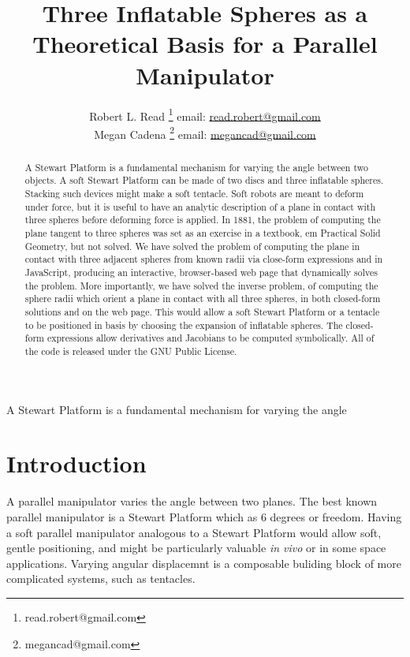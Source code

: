 \documentclass{article}
\title{Three Inflatable Spheres as a Theoretical Basis for a Parallel Manipulator}
\author{Robert L. Read
  \thanks{read.robert@gmail.com}
  email: \href{mailto:read.robert@gmail.com}{read.robert@gmail.com}\\
Megan Cadena
  \thanks{megancad@gmail.com}
  email: \href{mailto:megancad@gmail.com}{megancad@gmail.com}
  }
\begin{document}
A Stewart Platform\cite{wiki:stewart} is a fundamental mechanism for varying the angle

\maketitle
\begin{abstract}
  A Stewart Platform\cite{wiki:stewart} is a fundamental mechanism for varying the angle
  between two objects.
  A soft Stewart Platform can be made of two discs and
  three inflatable spheres.
  Stacking such devices might make a soft tentacle.
  Soft robots are meant to deform under force, but it is useful to have
  an analytic description of a plane in contact with three spheres
  before deforming force is applied.
  In 1881, the problem of computing the plane tangent to three spheres was
  set as an exercise in a textbook, {em Practical Solid Geometry}\cite{payne1881},
  but not solved.
  We have solved the problem of computing the plane in contact with
  three adjacent spheres from known radii via close-form expressions and
  in JavaScript, producing an interactive,
  browser-based web page that dynamically solves the problem\cite{softrobotcalc}.
  More importantly, we have solved the inverse problem, of computing the
  sphere radii which orient a plane in contact with all three spheres, in
  both closed-form solutions and on the web page.
  This would allow a soft Stewart Platform or a tentacle to be positioned
  in basis by choosing the expansion of inflatable spheres.
  The closed-form expressions allow derivatives and Jacobians to be computed
  symbolically.
  All of the code is released under the GNU Public License.
\end{abstract}


\section{Introduction}

A parallel manipulator varies the angle between two planes.
The best known parallel manipulator is
a Stewart Platform\cite{wiki:stewart} which as 6 degrees or freedom.
Having a soft parallel manipulator analogous to a Stewart Platform would allow soft,
gentle positioning,
and might be particularly valuable {\it in vivo}\cite{softwhite2018soft} or in some space applications\cite{glassner2020}.
Varying angular displacemnt is a composable buliding block of more complicated systems, such as tentacles.
\end{document}
